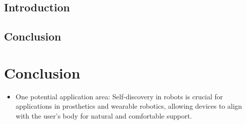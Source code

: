 \documentclass[12pt, a4paper]{article}
\begin{document}
\subsection*{Introduction}

\subsection*{Conclusion}


\section*{Conclusion}
\begin{itemize}
	\item One potential application area: Self-discovery in robots is crucial for applications in prosthetics and wearable robotics, allowing devices to align with the user's body for natural and comfortable support.
\end{itemize}


\printbibliography


\end{document}
